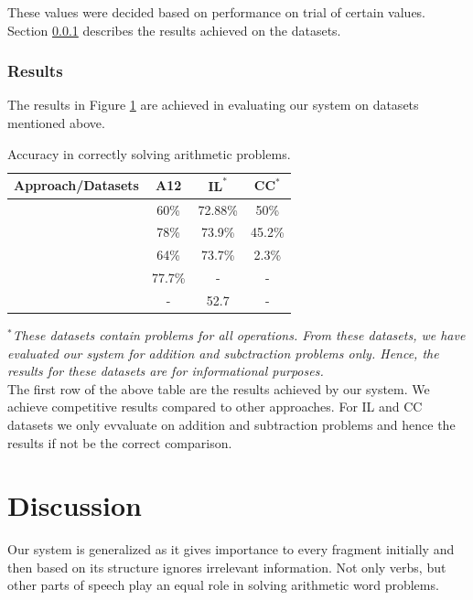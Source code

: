\documentclass[11pt]{article}
\begin{document}
These values were decided based on performance on trial of certain values. Section \ref{sec:results} describes the results achieved on the datasets.

\subsubsection{Results}\label{sec:results}

The results in Figure \ref{figure:24} are achieved in evaluating our system on datasets mentioned above. 

\begin{table}[h!]
\begin{center}
\begin{tabular}{|c|c|c|c|}
\hline
\textbf{Approach/Datasets} & \textbf{A12} & $\textbf{IL}^{*}$ & $\textbf{CC}^{*}$ \\
\hline
 & 60\% & 72.88\% & 50\% \\
\hline
~\citep{RoyR15} & 78\% & 73.9\% & 45.2\% \\
\hline
~\citep{Kushman} & 64\% & 73.7\% & 2.3\% \\
\hline
~\citep{ARIS} & 77.7\% & - & - \\
\hline
~\citep{RoyTACL15} & - & 52.7 & - \\
\hline
\end{tabular}
\end{center}
\caption{Accuracy in correctly solving arithmetic problems.}
\label{figure:24}
\end{table}

\textit{$^{*}$These datasets contain problems for all operations. From these datasets, we have evaluated our system for addition and subctraction problems only. Hence, the results for these datasets are for informational purposes.}\\

The first row of the above table are the results achieved by our system. We achieve competitive results compared to other approaches. For IL and CC datasets we only evvaluate on addition and subtraction problems and hence the results if not be the correct comparison.

\section{Discussion}\label{sec:discussion}

Our system is generalized as it gives importance to every fragment initially and then based on its structure ignores irrelevant information. Not only verbs\citep{ARIS}, but other parts of speech play an equal role in solving arithmetic word problems. 
\end{document}
